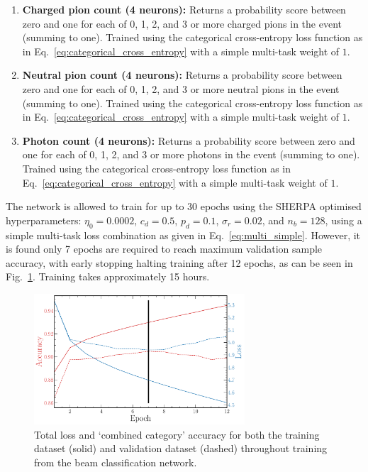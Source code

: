 \begin{enumerate}
    \item \textbf{Charged pion count (4 neurons):} Returns a probability score between zero and
          one for each of 0, 1, 2, and 3 or more charged pions in the event (summing to one).
          Trained using the categorical cross-entropy loss function as in
          Eq.~\ref{eq:categorical_cross_entropy} with a simple multi-task weight of $1$.
    \item \textbf{Neutral pion count (4 neurons):} Returns a probability score between zero and
          one for each of 0, 1, 2, and 3 or more neutral pions in the event (summing to one).
          Trained using the categorical cross-entropy loss function as in
          Eq.~\ref{eq:categorical_cross_entropy} with a simple multi-task weight of $1$.
    \item \textbf{Photon count (4 neurons):} Returns a probability score between zero and one for
          each of 0, 1, 2, and 3 or more photons in the event (summing to one). Trained using the
          categorical cross-entropy loss function as in Eq.~\ref{eq:categorical_cross_entropy}
          with a simple multi-task weight of $1$.
\end{enumerate}

The network is allowed to train for up to 30 epochs using the SHERPA optimised hyperparameters:
$\eta_{0}=0.0002$, $c_{d}=0.5$, $p_{d}=0.1$, $\sigma_{r}=0.02$, and $n_{b}=128$, using a simple
multi-task loss combination as given in Eq.~\ref{eq:multi_simple}. However, it is found only 7
epochs are required to reach maximum validation sample accuracy, with early stopping halting
training after 12 epochs, as can be seen in Fig.~\ref{fig:final_beam_history}. Training takes
approximately 15 hours.

\begin{figure} %
    \includegraphics[width=0.7\textwidth]{diagrams/6-cvn/chipsnet/final_beam_history.pdf}
    \caption[Loss and accuracy throughout training for the beam classification network.]
    {Total loss and `combined category' accuracy for both the training dataset (solid) and
        validation dataset (dashed) throughout training from the beam classification network.}
    \label{fig:final_beam_history}
\end{figure}

